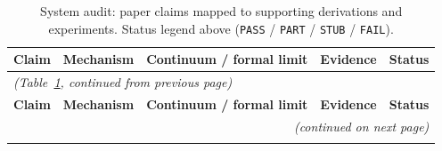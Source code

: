 {\scriptsize
\setlength{\tabcolsep}{4pt}
\renewcommand{\arraystretch}{0.95}
\begin{longtable}{@{}p{2.6cm}p{3.8cm}p{3.2cm}p{4.4cm}p{1.0cm}@{}}
\caption{\small System audit: paper claims mapped to supporting
derivations and experiments.  Status legend above
(\texttt{PASS} / \texttt{PART} / \texttt{STUB} / \texttt{FAIL}).}
\label{tab:audit} \\
\hline
\textbf{Claim} & \textbf{Mechanism} & \textbf{Continuum / formal limit} & \textbf{Evidence} & \textbf{Status} \\
\hline
\endfirsthead

\multicolumn{5}{l}{\textit{(Table~\ref{tab:audit}, continued from previous page)}} \\
\hline
\textbf{Claim} & \textbf{Mechanism} & \textbf{Continuum / formal limit} & \textbf{Evidence} & \textbf{Status} \\
\hline
\endhead

\hline
\multicolumn{5}{r}{\textit{(continued on next page)}} \\
\endfoot

\hline
\endlastfoot


\end{longtable}}
